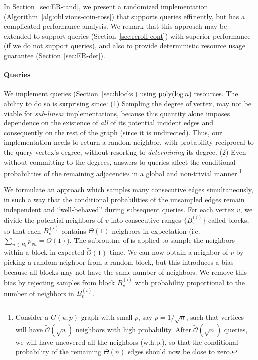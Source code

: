 In Section~\ref{sec:ER-rand}, we present a randomized implementation (Algorithm~\ref{alg:oblivious-coin-toss})
that supports  queries efficiently, but has a complicated performance analysis.
We remark that this approach may be extended to support  queries (Section~\ref{sec:reroll-cont}) with superior performance
(if we do not support  queries),
and also to provide deterministic resource usage guarantee (Section~\ref{sec:ER-det}).


\paragraph*{ Queries}
\label{par:random_neighbor_queries}
We implement  queries (Section~\ref{sec:blocks}) using $\mathrm{poly}(\log n)$ resources.
The ability to do so is surprising since:
(1) Sampling the degree of vertex, may not be viable for \emph{sub-linear} implementations, because this quantity alone
imposes dependence on the existence of \emph{all} of its potential incident edges and consequently on the rest of the graph (since it is undirected).
Thus, our implementation needs to return a random neighbor, with probability reciprocal to the query vertex's degree,
without resorting to \emph{determining} its degree.
(2) Even without committing to the degrees, answers to  queries
affect the conditional probabilities of the remaining adjacencies in a global and non-trivial manner.\footnote{
\label{conditional} Consider a $G(n,p)$ graph with small $p$, say $p = 1/\sqrt n$,
such that vertices will have $\widetilde{\mathcal{O}}(\sqrt n)$ neighbors with high probability.
After $\widetilde{\mathcal{O}}(\sqrt n)$  queries, we will have uncovered all the neighbors (w.h.p.),
so that the conditional probability of the remaining $\Theta(n)$ edges should now be close to zero.}

We formulate an approach which samples many consecutive edges simultaneously,
in such a way that the conditional probabilities of the unsampled edges remain independent and ``well-behaved'' during subsequent queries.
For each vertex $v$, we divide the potential neighbors of $v$ into consecutive ranges $\{B^{(i)}_v\}$ called blocks,
so that each $B^{(i)}_v$ contains $\Theta(1)$ neighbors in expectation (i.e. $\sum_{u\in B_i} p_{vu} = \Theta(1)$).
The subroutine of  is applied to sample the neighbors within a block in expected $\mathcal{\widetilde O}(1)$ time.
We can now obtain a neighbor of $v$ by picking a random neighbor from a random block,
but this introduces a bias because all blocks may not have the same number of neighbors.
We remove this bias by rejecting samples from block $B^{(i)}_v$ with probability proportional to the number of neighbors in $B^{(i)}_v$.




